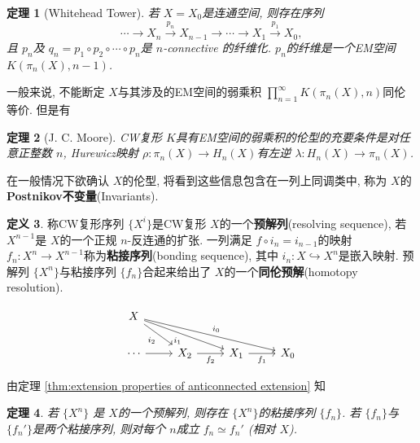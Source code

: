 \documentclass{ctexart}
\theoremstyle{plain}
\newtheorem{theorem}{定理}[section]
\theoremstyle{definition}
\newtheorem{definition}[theorem]{定义}
\renewcommand{\emph}{\textbf}
\begin{document}
        \begin{theorem}[Whitehead Tower]
            若 $X=X_0$是连通空间, 则存在序列
            \begin{equation*}
                \cdots \rightarrow X_n \xrightarrow{p_n} X_{n-1} \rightarrow \cdots \rightarrow X_1 \xrightarrow{p_1} X_0 ,
            \end{equation*}
            且 $p_{n}$及 $q_{n}=p_1\circ p_2\circ \cdots\circ p_{n}$是 $n$-connective 的纤维化. $p_{n}$的纤维是一个EM空间 $K(\pi_{n}(X),n-1)$.
        \end{theorem}

        一般来说, 不能断定 $X$与其涉及的EM空间的弱乘积 $\prod_{n=1}^{\infty} K(\pi_{n}(X),n)$同伦等价. 但是有

        \begin{theorem}[J. C. Moore]
            \label{thm:criteria for exact Postnikov approx}
            CW复形 $K$具有EM空间的弱乘积的伦型的充要条件是对任意正整数 $n$, Hurewicz映射 $\rho:\pi_{n}(X)\to H_{n}(X)$有左逆 $\lambda:H_{n}(X)\to \pi_{n}(X)$.
        \end{theorem}

        在一般情况下欲确认 $X$的伦型, 将看到这些信息包含在一列上同调类中, 称为 $X$的\emph{Postnikov不变量}(Invariants).

        \begin{definition}
            称CW复形序列 $\{X^{i}\}$是CW复形 $X$的一个\emph{预解列}(resolving sequence), 若 $X^{n-1}$是 $X$的一个正规 $n$-反连通的扩张. 一列满足 $f\circ i_{n}=i_{n-1}$的映射 $f_{n}:X^{n}\to X^{n-1}$称为\emph{粘接序列}(bonding sequence), 其中 $i_{n}:X\hookrightarrow X^{n}$是嵌入映射. 预解列 $\{X^{n}\}$与粘接序列 $\{f_{n}\}$合起来给出了 $X$的一个\emph{同伦预解}(homotopy resolution).
        \end{definition}

        \begin{equation*}
          \begin{tikzcd}
            X \arrow[rd, "i_2"'] \arrow[rrd, "i_1"'] \arrow[rrrd, "i_0"] & & & \\
            \cdots \arrow[r] & X_2 \arrow[r, "f_2"'] & X_1 \arrow[r, "f_1"'] & X_0
          \end{tikzcd}
        \end{equation*}

        由定理 \ref{thm:extension properties of anticonnected extension} 知 
        \begin{theorem}
            若 $\{X^{n}\}$ 是 $X$的一个预解列, 则存在 $\{X^{n}\}$的粘接序列 $\{f_{n}\}$. 若 $\{f_{n}\}$与 $\{f_{n}'\}$是两个粘接序列, 则对每个 $n$成立 $f_{n}\simeq f_{n}'$ (相对 $X$).
        \end{theorem}
\end{document}
